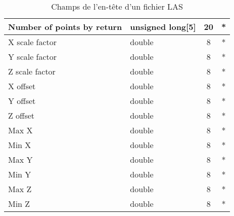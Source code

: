 \begin{table}[htpb!]
\begin{tabular}{|l|l|c|c|}
Number of points by return           & unsigned long{[}5{]}     & 20    & * \\ \hline
X scale factor                       & double                   & 8     & * \\ \hline
Y scale factor                       & double                   & 8     & * \\ \hline
Z scale factor                       & double                   & 8     & * \\ \hline
X offset                             & double                   & 8     & * \\ \hline
Y offset                             & double                   & 8     & * \\ \hline
Z offset                             & double                   & 8     & * \\ \hline
Max X                                & double                   & 8     & * \\ \hline
Min X                                & double                   & 8     & * \\ \hline
Max Y                                & double                   & 8     & * \\ \hline
Min Y                                & double                   & 8     & * \\ \hline
Max Z                                & double                   & 8     & * \\ \hline
Min Z                                & double                   & 8     & * \\ \hline
\end{tabular}
\caption[Champs de l'en-tête d'un fichier LAS]{Champs de l'en-tête d'un fichier LAS}
\label{tab:las_header}
\end{table}

% 
% 


\stopcontents[annexes]
\resumecontents[default]
